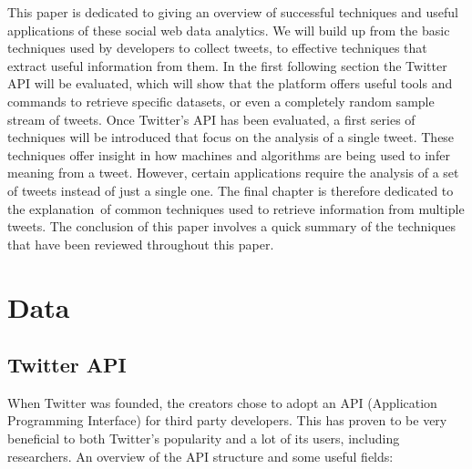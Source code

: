\documentclass{article}
\begin{document}
This paper is dedicated to giving an overview of successful techniques and useful applications of these social web data analytics. 
We will build up from the basic techniques used by developers to collect tweets, to effective techniques that extract useful information from them. 
In the first following section the Twitter API will be evaluated, which will show that the platform offers useful tools and commands to retrieve 
specific datasets, or even a completely random sample stream of tweets. Once Twitter's API has been evaluated, a first series of techniques will be introduced
that focus on the analysis of a single tweet. These techniques offer insight in how machines and algorithms are being used to infer meaning from a tweet.
However, certain applications require the analysis of a set of tweets instead of just a single one. The final chapter is therefore dedicated to the explanation\
of common techniques used to retrieve information from multiple tweets. The conclusion of this paper involves a quick summary of the techniques that
have been reviewed throughout this paper.

\section{Data}

\subsection{Twitter API}

When Twitter was founded, the creators chose to adopt an API (Application Programming Interface) for third party developers. This has proven to be very
beneficial to both Twitter's popularity and a lot of its users, including researchers. An overview of the API structure and some useful fields\cite{TwitterDev}:
\end{document}

